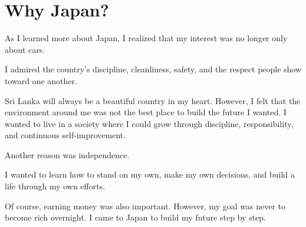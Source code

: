 \section{Why Japan?}

As I learned more about Japan, I realized that my interest was no longer only about cars.

I admired the country's discipline, cleanliness, safety, and the respect people show toward one another.

Sri Lanka will always be a beautiful country in my heart. However, I felt that the environment around me was not the best place to build the future I wanted. I wanted to live in a society where I could grow through discipline, responsibility, and continuous self-improvement.

Another reason was independence.

I wanted to learn how to stand on my own, make my own decisions, and build a life through my own efforts.

Of course, earning money was also important. However, my goal was never to become rich overnight. I came to Japan to build my future step by step.
